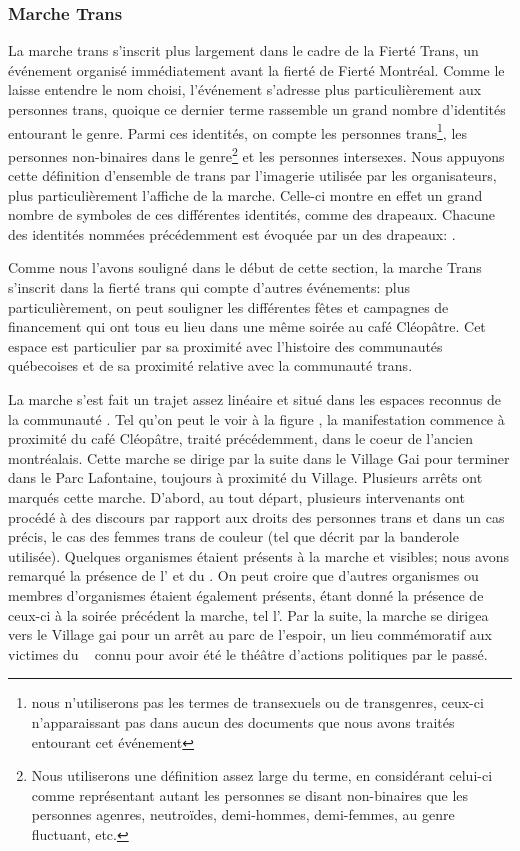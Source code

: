 \subsubsection{Marche Trans}
\label{subsubsec:marchetrans}
La marche trans s'inscrit plus largement dans le cadre de la Fierté Trans, un événement organisé immédiatement avant la fierté de Fierté Montréal. 
Comme le laisse entendre le nom choisi, l'événement s'adresse plus particulièrement aux personnes trans, quoique ce dernier terme rassemble un grand nombre d'identités entourant le genre. 
Parmi ces identités, on compte les personnes trans\footnote{nous n'utiliserons pas les termes de transexuels ou de   transgenres, ceux-ci n'apparaissant pas dans aucun des documents que nous   avons traités entourant cet événement}, les personnes non-binaires dans le genre\footnote{Nous utiliserons une définition assez large du terme, en   considérant celui-ci comme représentant autant les personnes se disant   non-binaires que les personnes agenres, neutroïdes, demi-hommes, demi-femmes,   au genre fluctuant, etc.\citep[see][]{Barker2015}} et les personnes intersexes. 
Nous appuyons cette définition d'ensemble de trans par l'imagerie utilisée par les organisateurs, plus particulièrement l'affiche de la marche.
Celle-ci montre en effet un grand nombre de symboles de ces différentes identités, comme des drapeaux. 
Chacune des identités nommées précédemment est évoquée par un des drapeaux: .

Comme nous l'avons souligné dans le début de cette section, la marche Trans s'inscrit dans la fierté trans qui compte d'autres événements: plus particulièrement, on peut souligner les différentes fêtes et campagnes de financement qui ont tous eu lieu dans une même soirée au café Cléopâtre. 
Cet espace est particulier par sa proximité avec l'histoire des communautés \lgbt{} québecoises et de sa proximité relative avec la communauté trans.

La marche s'est fait un trajet assez linéaire et situé dans les espaces reconnus de la communauté \lgbt{}. 
Tel qu'on peut le voir à la figure , la manifestation commence à proximité du café Cléopâtre, traité précédemment, dans le coeur de l'ancien  montréalais. 
Cette marche se dirige par la suite dans le Village Gai pour terminer dans le Parc Lafontaine, toujours à proximité du Village. 
Plusieurs arrêts ont marqués cette marche. 
D'abord, au tout départ, plusieurs intervenants ont procédé à des discours par rapport aux droits des personnes trans et dans un cas précis, le cas des femmes trans de couleur (tel que décrit par la banderole utilisée).
Quelques organismes étaient présents à la marche et visibles; nous avons remarqué la présence de l'\atq{} et du \rlq{}. 
On peut croire que d'autres organismes ou membres d'organismes étaient également présents, étant donné la présence de ceux-ci à la soirée précédent la marche, tel l'\astteq{}. 
Par la suite, la marche se dirigea vers le Village gai pour un arrêt au parc de l'espoir, un lieu commémoratif aux victimes du \sida{}~\citep{Lafontaine2012} connu pour avoir été le théâtre d'actions politiques par le passé.

